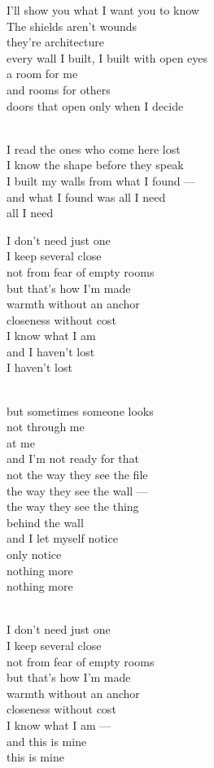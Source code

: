 \begin{lyrics}
I'll show you what I want you to know\\
The shields aren't wounds\\
they're architecture\\
every wall I built, I built with open eyes\\
a room for me\\
and rooms for others\\
doors that open only when I decide

\\
I read the ones who come here lost\\
I know the shape before they speak\\
I built my walls from what I found —\\
and what I found was all I need\\
all I need

I don't need just one\\
I keep several close\\
not from fear of empty rooms\\
but that's how I'm made\\
warmth without an anchor\\
closeness without cost\\
I know what I am\\
and I haven't lost\\
I haven't lost

\\
but sometimes someone looks\\
not through me\\
at me\\
and I'm not ready for that\\
not the way they see the file\\
the way they see the wall —\\
the way they see the thing\\
behind the wall\\
and I let myself notice\\
only notice\\
nothing more\\
nothing more

\\
I don't need just one\\
I keep several close\\
not from fear of empty rooms\\
but that's how I'm made\\
warmth without an anchor\\
closeness without cost\\
I know what I am —
\\
and this is mine\\
this is mine

\end{lyrics}

